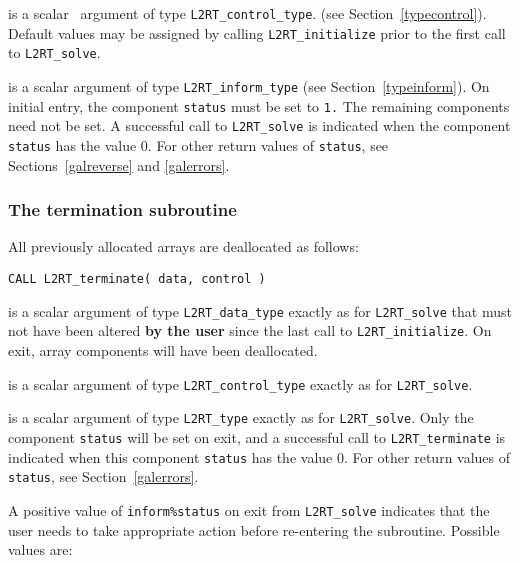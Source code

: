 \documentclass{galahad}
\newcommand{\packagename}{L2\-RT}
\begin{document}
\begin{description}
 is a scalar \intentin\ argument of type 
{\tt \packagename\_control\_type}. 
(see Section~\ref{typecontrol}). 
Default values may be assigned by calling {\tt \packagename\_initialize} 
prior to the first call to {\tt \packagename\_solve}.  
 
 is a scalar \intentinout argument of type 
{\tt \packagename\_inform\_type}
(see Section~\ref{typeinform}). 
On initial entry, the component {\tt status} must be set to {\tt 1.} 
The remaining components need not be set. 
A successful call to
{\tt \packagename\_solve}
is indicated when the  component {\tt status} has the value 0. 
For other return values of {\tt status}, see Sections~\ref{galreverse} 
and \ref{galerrors}.
\end{description}


\subsubsection{The  termination subroutine}
All previously allocated arrays are deallocated as follows:

\hskip0.5in 
{\tt CALL \packagename\_terminate( data, control )}

\begin{description}

 is a scalar \intentinout argument of type 
{\tt \packagename\_data\_type} 
exactly as for
{\tt \packagename\_solve}
that must not have been altered {\bf by the user} since the last call to 
{\tt \packagename\_initialize}.
On exit, array components will have been deallocated. 

 is a scalar \intentin argument of type 
{\tt \packagename\_control\_type}
exactly as for
{\tt \packagename\_solve}.

 is a scalar \intentout argument of type {\tt \packagename\_type}
exactly as for
{\tt \packagename\_solve}.
Only the component {\tt status} will be set on exit, and a 
successful call to 
{\tt \packagename\_terminate}
is indicated when this  component {\tt status} has the value 0. 
For other return values of {\tt status}, see Section~\ref{galerrors}.

\end{description}


\galreverse
A positive value of {\tt inform\%status} on exit from  
{\tt \packagename\_solve} indicates that the user needs to take appropriate 
action before re-entering the subroutine. Possible values are: 
 
\end{document}
